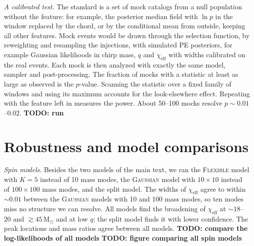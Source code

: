 \documentclass[%
 onecolumn,
 amsmath,amssymb,
 aps,
 prl,
 nofootinbib,nobibnotes,
]{revtex4-2}
\newcommand{\Msun}{\ensuremath{\mathrm{M}_{\odot}}}
\newcommand{\chieff}{\ensuremath{\chi_{\mathrm{eff}}}}
\newcommand{\todo}[1]{{\color{Blue}\bf TODO: #1}}
\newcommand{\flexiblespins}{\textsc{Flexible}\xspace}
\newcommand{\gaussianspins}{\textsc{Gaussian}\xspace}
\begin{document}
\textit{A calibrated test.} The standard is a set of mock catalogs from a null population without the feature: for example, the posterior median field with $\ln p$ in the window replaced by the chord, or by the conditional mean from outside, keeping all other features. Mock events would be drawn through the selection function, by reweighting and resampling the injections, with simulated \ac{PE} posteriors, for example Gaussian likelihoods in chirp mass, $q$ and $\chieff$ with widths calibrated on the real events. Each mock is then analyzed with exactly the same model, sampler and post-processing. The fraction of mocks with a statistic at least as large as observed is the $p$-value. Scanning the statistic over a fixed family of windows and using its maximum accounts for the look-elsewhere effect. Repeating with the feature left in measures the power. About 50--100 mocks resolve $p \sim 0.01$--$0.02$. \todo{run}

\section{Robustness and model comparisons}
\label{sm: robustness}

\textit{Spin models.} Besides the two models of the main text, we ran the \flexiblespins model with $K = 5$ instead of 10 mass modes, the \gaussianspins model with $10 \times 10$ instead of $100 \times 100$ mass modes, and the split model. The widths of $\chieff$ agree to within $\sim 0.01$ between the \gaussianspins models with 10 and 100 mass modes, so ten modes miss no structure we can resolve. All models find the broadening of $\chieff$ at $\sim 18$--$20$ and $\gtrsim 45\,\Msun$ and at low $q$; the split model finds it with lower confidence. The peak locations and mass ratios agree between all models. \todo{compare the log-likelihoods of all models} \todo{figure comparing all spin models}
\end{document}
